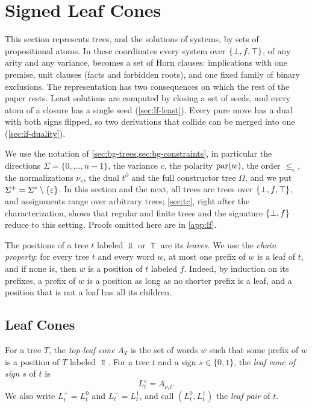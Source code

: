 
\section{Signed Leaf Cones}\label{sec:lf}

This section represents trees, and the solutions of systems, by sets of
propositional atoms. In these coordinates every system over $\{\bot,f,\top\}$, of any
arity and any variance, becomes a set of Horn clauses: implications with one
premise, unit clauses (facts and forbidden roots), and one fixed family of binary
exclusions. The representation has two consequences on which the rest of the
paper rests. Least solutions are computed by closing a set of seeds, and every
atom of a closure has a single seed (\cref{sec:lf-least}). Every pure move
has a dual with both signs flipped, so two derivations that collide can be
merged into one (\cref{sec:lf-duality}).

We use the notation of \cref{sec:bg-trees,sec:bg-constraints}, in
particular the directions $\Sigma=\{0,\dots,n-1\}$, the variance $c$, the
polarity $\operatorname{par}(w)$, the order $\le_c$, the normalizations $\nu_s$, the dual
$t^\partial$ and the full constructor tree $\Omega$, and we put
$\Sigma^+=\Sigma^*\setminus\{\varepsilon\}$.
In this section and the next, all trees are trees over $\{\bot,f,\top\}$, and
assignments range over arbitrary trees; \cref{sec:tc}, right after the
characterization, shows that regular and finite trees and the signature $\{\bot,f\}$
reduce to this setting. Proofs omitted here are in \cref{app:lf}.

The positions of a tree $t$ labeled $\Bot$ or $\Top$ are its \emph{leaves}. We
use the \emph{chain property}: for every tree $t$ and every word $w$, at most
one prefix of $w$ is a leaf of $t$, and if none is, then $w$ is a position of
$t$ labeled $f$. Indeed, by induction on its prefixes, a prefix of $w$ is a
position as long as no shorter prefix is a leaf, and a position that is not a
leaf has all its children.

\subsection{Leaf Cones}\label{sec:lf-cones}

\begin{definition}\label{def:lf-cones}
For a tree $T$, the \emph{top-leaf cone} $A_T$ is the set of words $w$ such
that some prefix of $w$ is a position of $T$ labeled $\Top$. For a tree $t$
and a sign $s\in\{0,1\}$, the \emph{leaf cone of sign $s$} of $t$ is
\[
 L^s_t=A_{\nu_st}.
\]
We also write $L^+_t=L^0_t$ and $L^-_t=L^1_t$, and call $(L^0_t,L^1_t)$ the
\emph{leaf pair} of $t$.
\end{definition}

